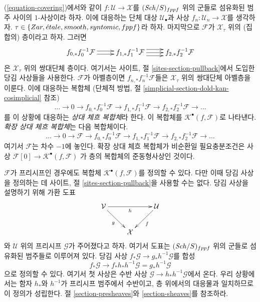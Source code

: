 \noindent
(\ref{equation-covering})에서와 같이 $f : \mathcal{U} \to \mathcal{X}$를
$(\mathit{Sch}/S)_{fppf}$ 위의 군들로 섬유화된 범주 사이의 $1$-사상이라 하자.
이에 대응하는 단체 대상 $\mathcal{U}_\bullet$과 사상
$f_n : \mathcal{U}_n \to \mathcal{X}$를 생각하자.
$\tau \in \{Zar, {\acute{e}tale}, smooth, syntomic, fppf\}$라 하자.
마지막으로 $\mathcal{F}$가 $\mathcal{X}_\tau$ 위의 (집합의) 층이라고 하자.
그러면
$$
\xymatrix{
f_{0, *}f_0^{-1}\mathcal{F}
\ar@<0.5ex>[r]
\ar@<-0.5ex>[r]
&
f_{1, *}f_1^{-1}\mathcal{F}
\ar@<1ex>[r]
\ar@<0ex>[r]
\ar@<-1ex>[r]
&
f_{2, *}f_2^{-1}\mathcal{F}
}
$$
은 $\mathcal{X}_\tau$ 위의 쌍대단체 층이다. 여기서는
사이트, 절 \ref{sites-section-pullback}에서 도입한
당김 사상들을 사용한다.
$\mathcal{F}$가 아벨층이면 $f_{n, *}f_n^{-1}\mathcal{F}$들은
$\mathcal{X}_\tau$ 위의 쌍대단체 아벨층을 이룬다.
이에 대응하는 복합체
(단체적 방법, 절 \ref{simplicial-section-dold-kan-cosimplicial} 참조)
$$
\ldots \to 0 \to
f_{0, *}f_0^{-1}\mathcal{F} \to
f_{1, *}f_1^{-1}\mathcal{F} \to
f_{2, *}f_2^{-1}\mathcal{F} \to \ldots
$$
를 이 상황에 대응하는 {\it 상대 체흐 복합체}라 한다.
이 복합체를 $\mathcal{K}^\bullet(f, \mathcal{F})$로 나타낸다.
{\it 확장 상대 체흐 복합체}는 다음 복합체이다.
$$
\ldots \to 0 \to
\mathcal{F} \to
f_{0, *}f_0^{-1}\mathcal{F} \to
f_{1, *}f_1^{-1}\mathcal{F} \to
f_{2, *}f_2^{-1}\mathcal{F} \to \ldots
$$
여기서 $\mathcal{F}$는 차수 $-1$에 놓인다. 확장 상대 체흐 복합체가
비순환일 필요충분조건은 사상
$\mathcal{F}[0] \to \mathcal{K}^\bullet(f, \mathcal{F})$
가 층의 복합체의 준동형사상인 것이다.

\begin{remark}
\label{remark-cech-complex-presheaves}
$\mathcal{F}$가 프리시프인 경우에도
복합체 $\mathcal{K}^\bullet(f, \mathcal{F})$를 정의할 수 있다.
다만 이때 당김 사상을 정의하는 데
사이트, 절 \ref{sites-section-pullback}을 사용할 수는 없다.
당김 사상을 설명하기 위해 가환 도표
$$
\xymatrix{
\mathcal{V} \ar[rd]_g \ar[rr]_h & &  \mathcal{U} \ar[ld]^f \\
& \mathcal{X}
}
$$
와 $\mathcal{U}$ 위의 프리시프 $\mathcal{G}$가 주어졌다고 하자.
여기서 도표는 $(\mathit{Sch}/S)_{fppf}$ 위의 군들로 섬유화된 범주들로
이루어져 있다. 당김 사상
$f_*\mathcal{G} \to g_*h^{-1}\mathcal{G}$를 합성
$$
f_*\mathcal{G} \longrightarrow
f_*h_*h^{-1}\mathcal{G} = g_*h^{-1}\mathcal{G}
$$
으로 정의할 수 있다. 여기서 첫 사상은 수반 사상
$\mathcal{G} \to h_*h^{-1}\mathcal{G}$에서 온다.
우리 상황에서는 함자 $h_*$와 $h^{-1}$가 프리시프 범주에서
수반이고, 층 위에서의 대응물과 일치하므로 이 정의가 성립한다.
절 \ref{section-presheaves}와 \ref{section-sheaves}를 참조하라.
\end{remark}

